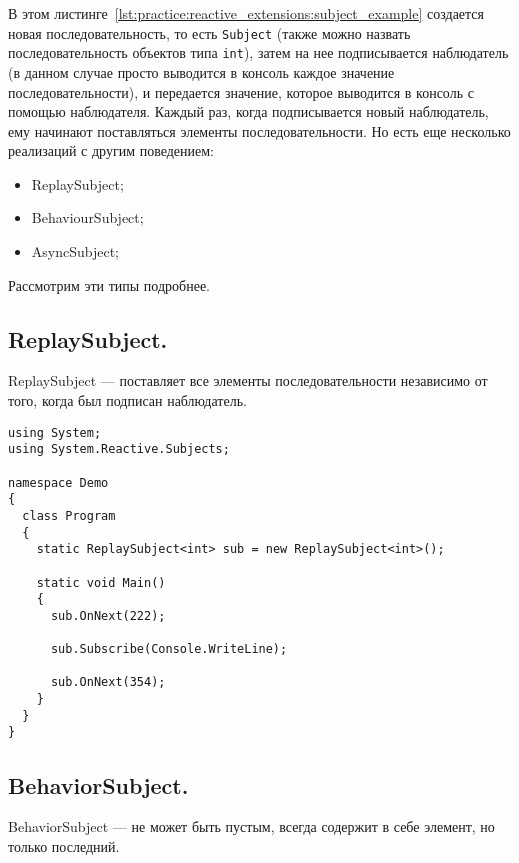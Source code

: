 В этом листинге~\ref{lst:practice:reactive_extensions:subject_example} создается новая последовательность, то есть \lstinline[style=csharpinlinestyle]!Subject!
(также можно назвать последовательность объектов типа \lstinline[style=csharpinlinestyle]!int!),
затем на нее подписывается наблюдатель (в данном случае просто выводится в консоль каждое значение последовательности),
и передается значение, которое выводится в консоль с помощью наблюдателя. Каждый раз, когда подписывается новый наблюдатель,
ему начинают поставляться элементы последовательности. Но есть еще несколько реализаций с другим поведением:

\begin{itemize}
  \item ReplaySubject;
  \item BehaviourSubject;
  \item AsyncSubject;
\end{itemize}

Рассмотрим эти типы подробнее.

\subsection{ReplaySubject. }
\label{subsub:practice:reactive_extensions:replay_subject}

ReplaySubject --- поставляет все элементы последовательности независимо от того, когда был подписан наблюдатель.

\begin{lstlisting}[style=csharpinlinestyle, caption={Пример использования ReplaySubject}, label=lst:practice:reactive_extensions:replay_subject_example]
using System;
using System.Reactive.Subjects;

namespace Demo
{
  class Program
  {
    static ReplaySubject<int> sub = new ReplaySubject<int>();

    static void Main()
    {
      sub.OnNext(222);

      sub.Subscribe(Console.WriteLine);

      sub.OnNext(354);
    }
  }
}
\end{lstlisting}

\subsection{BehaviorSubject. }
\label{subsub:practice:reactive_extensions:behavior_subject}

BehaviorSubject --- не может быть пустым, всегда содержит в себе элемент, но только последний.

